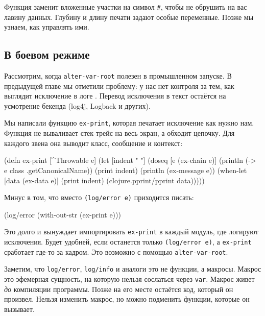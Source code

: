 Функция заменит вложенные участки на символ \verb|#|, чтобы не обрушить на
вас лавину данных. Глубину и длину печати задают особые переменные. Позже мы
узнаем, как управлять ими.

\subsection{В боевом режиме}

\label{install-logger}


Рассмотрим, когда \verb|alter-var-root| полезен в промышленном запуске. В
предыдущей главе мы отметили проблему: у нас нет контроля за тем, как выглядит
исключение в логе . Перевод исключения в текст остаётся на
усмотрение бекенда (log4j, Logback и других).

Мы написали функцию \verb|ex-print|, которая печатает исключение как нужно
нам. Функция не вываливает стек-трейс на весь экран, а обходит цепочку. Для
каждого звена она выводит класс, сообщение и контекст:

\begin{english}
  \begin{clojure}
(defn ex-print
  [^Throwable e]
  (let [indent "  "]
    (doseq [e (ex-chain e)]
      (println (-> e class .getCanonicalName))
      (print indent)
      (println (ex-message e))
      (when-let [data (ex-data e)]
        (print indent)
        (clojure.pprint/pprint data)))))
  \end{clojure}
\end{english}

\noindent
Минус в том, что вместо \verb|(log/error e)| приходится писать:

\begin{english}
  \begin{clojure}
(log/error (with-out-str (ex-print e)))
  \end{clojure}
\end{english}

\noindent
Это долго и вынуждает импортировать \verb|ex-print| в каждый модуль, где логируют
исключения. Будет удобней, если останется только \verb|(log/error e)|, а
\verb|ex-print| сработает где-то за кадром. Это возможно с помощью
\verb|alter-var-root|.

Заметим, что \verb|log/error|, \verb|log/info| и аналоги это не функции, а
макросы. Макрос это эфемерная сущность, на которую нельзя сослаться через
\verb|var|. Макрос живет \emph{до} компиляции программы. Позже на его месте
остаётся код, который он произвел. Нельзя изменить макрос, но можно подменить
функции, которые он вызывает.

